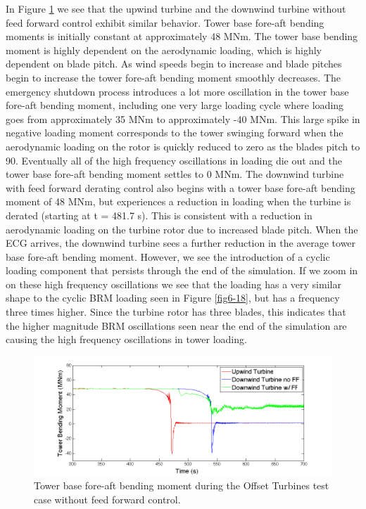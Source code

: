 In Figure \ref{fig6-19} we see that the upwind turbine and the downwind turbine without feed forward control exhibit similar behavior. Tower base fore-aft bending moments is initially constant at approximately 48 MNm. The tower base bending moment is highly dependent on the aerodynamic loading, which is highly dependent on blade pitch. As wind speeds begin to increase and blade pitches begin to increase the tower fore-aft bending moment smoothly decreases. The emergency shutdown process introduces a lot more oscillation in the tower base fore-aft bending moment, including one very large loading cycle where loading goes from approximately 35 MNm to approximately -40 MNm. This large spike in negative loading moment corresponds to the tower swinging forward when the aerodynamic loading on the rotor is quickly reduced to zero as the blades pitch to 90\degree. Eventually all of the high frequency oscillations in loading die out and the tower base fore-aft bending moment settles to 0 MNm. The downwind turbine with feed forward derating control also begins with a tower base fore-aft bending moment of 48 MNm, but experiences a reduction in loading when the turbine is derated (starting at t = 481.7 s). This is consistent with a reduction in aerodynamic loading on the turbine rotor due to increased blade pitch. When the ECG arrives, the downwind turbine sees a further reduction in the average tower base fore-aft bending moment. However, we see the introduction of a cyclic loading component that persists through the end of the simulation. If we zoom in on these high frequency oscillations we see that the loading has a very similar shape to the cyclic BRM loading seen in Figure \ref{fig6-18}, but has a frequency three times higher. Since the turbine rotor has three blades, this indicates that the higher magnitude BRM oscillations seen near the end of the simulation are causing the high frequency oscillations in tower loading. 



\begin{figure}[ht] 
	\centering
		\includegraphics[width = \linewidth]{Figures/ch6Figures/fig6-19.png}

	\caption{Tower base fore-aft bending moment during the Offset Turbines test case without feed forward control.}
	\label{fig6-19}
\end{figure}

